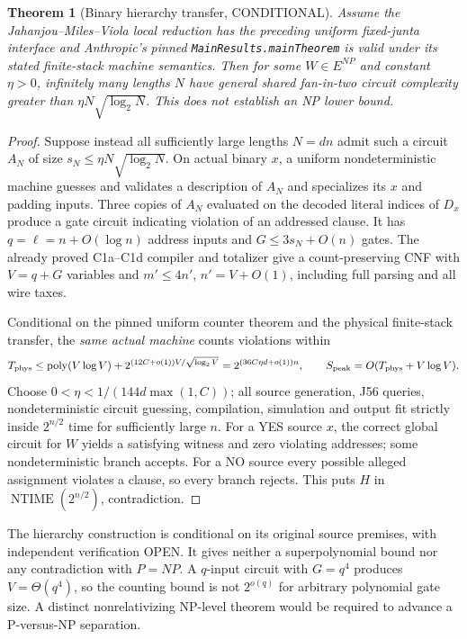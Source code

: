 \documentclass[11pt]{article}
\newtheorem{theorem}{Theorem}
\begin{document}
\begin{theorem}[Binary hierarchy transfer, CONDITIONAL]
Assume the Jahanjou--Miles--Viola local reduction has the preceding
uniform fixed-junta interface and Anthropic's pinned
\texttt{MainResults.mainTheorem} is valid under its stated finite-stack
machine semantics. Then for some $W\in E^{NP}$ and constant
$\eta>0$, infinitely many lengths $N$ have general shared
fan-in-two circuit complexity greater than
$\eta N\sqrt{\log_2 N}$. This does not establish an NP lower bound.
\end{theorem}
\begin{proof}
Suppose instead all sufficiently large lengths $N=dn$ admit such
a circuit $A_N$ of size $s_N\le\eta N\sqrt{\log_2N}$.
On actual binary $x$, a uniform nondeterministic machine guesses and
validates a description of $A_N$ and specializes its $x$ and padding
inputs. Three copies of $A_N$ evaluated on the decoded literal indices
of $D_x$ produce a gate circuit indicating violation of an addressed
clause. It has $q=\ell=n+O(\log n)$ address inputs and
$G\le3s_N+O(n)$ gates. The already proved C1a--C1d compiler and
totalizer give a count-preserving CNF with $V=q+G$ variables
and $m'\le4n'$, $n'=V+O(1)$, including full parsing and all wire taxes.

Conditional on the pinned uniform counter theorem and the physical
finite-stack transfer, the \emph{same actual machine} counts violations
within
\[
 T_{\rm phys}
 \le\operatorname{poly}(V\log V)
  +2^{(12C+o(1))V/\sqrt{\log_2V}}
 =2^{(36C\eta d+o(1))n},
 \qquad S_{\rm peak}=O(T_{\rm phys}+V\log V).
\]
Choose $0<\eta<1/(144d\max(1,C))$; all source generation,
J56 queries, nondeterministic circuit guessing, compilation, simulation
and output fit strictly inside $2^{n/2}$ time for sufficiently large $n$.
For a YES source $x$, the correct global circuit for $W$ yields a
satisfying witness and zero violating addresses; some nondeterministic
branch accepts. For a NO source every possible alleged assignment
violates a clause, so every branch rejects. This puts
$H$ in $\operatorname{NTIME}(2^{n/2})$, contradiction.
\end{proof}

The hierarchy construction is conditional on its original source
premises, with independent verification OPEN. It gives neither a
superpolynomial bound nor any contradiction with $P=NP$.
A $q$-input circuit with $G=q^4$ produces $V=\Theta(q^4)$, so
the counting bound is not $2^{o(q)}$ for arbitrary polynomial gate
size. A distinct nonrelativizing NP-level theorem would be required
to advance a P-versus-NP separation.
\end{document}
